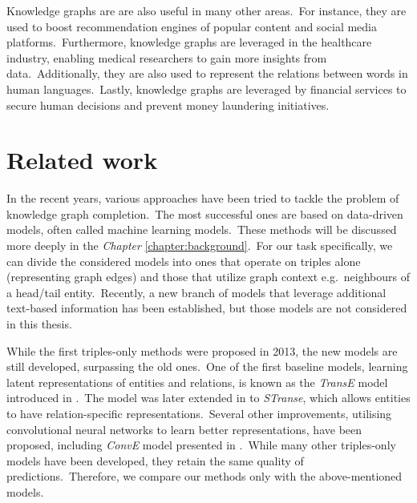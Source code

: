 \documentclass[longabstract, english, mgr]{iithesis}
\theoremstyle{default_theorem_style}\newtheorem{theorem}{Theorem}
\theoremstyle{default_theorem_style}\newtheorem{definition}{Definition}
\begin{document}
\noindent Knowledge graphs are are also useful in many other areas.\ For instance, they are used to boost
recommendation engines of popular content and social media platforms.\ Furthermore, knowledge graphs are leveraged
in the healthcare industry, enabling medical researchers to gain more insights from data.\ Additionally, they are
also used to represent the relations between words in human languages.\ Lastly, knowledge graphs are leveraged by
financial services to secure human decisions and prevent money laundering initiatives.


\section{Related work}

In the recent years, various approaches have been tried to tackle the problem of knowledge graph completion.\ The most
successful ones are based on data-driven models, often called machine learning models.\ These methods will be
discussed more deeply in the \textit{Chapter} \ref{chapter:background}.\ For our task specifically, we can divide the
considered models into ones that operate on triples alone (representing graph edges) and those that utilize graph
context e.g.\ neighbours of a head/tail entity.\ Recently, a new branch of models that leverage additional text-based
information has been established, but those models are not considered in this thesis.\newline

\noindent While the first triples-only methods were proposed in 2013, the new models are still developed, surpassing
the old ones.\ One of the first baseline models, learning latent representations of entities and relations, is known
as the \textit{TransE} model introduced in \cite{transe_model}.\ The model was later extended in \cite{stranse_model}
to \textit{STranse}, which allows entities to have relation-specific representations.\ Several other
improvements, utilising convolutional neural networks to learn better representations, have been proposed,
including \textit{ConvE} model presented in \cite{conve_model}.\ While many other triples-only models have been
developed, they retain the same quality of predictions.\ Therefore, we compare our methods only with the
above-mentioned models.\newline
\end{document}

